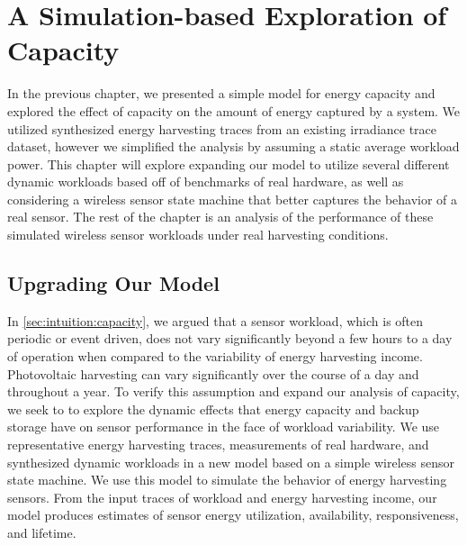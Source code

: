 \chapter{A Simulation-based Exploration of Capacity}
\label{chap:capacity}
In the previous chapter, we presented a simple model for energy capacity and explored the effect of capacity on the amount of energy captured by a system. 
We utilized synthesized energy harvesting traces from an existing irradiance trace dataset, however we simplified the analysis by assuming a static average workload power.
This chapter will explore expanding our model to utilize several different dynamic workloads based off of benchmarks of real hardware, as well as considering a wireless sensor state machine that better captures the behavior of a real sensor.
The rest of the chapter is an analysis of the performance of these simulated wireless sensor workloads under real harvesting conditions.

\section{Upgrading Our Model}
\label{sec:capacity:modelling}
In \cref{sec:intuition:capacity}, we argued that a sensor workload, which is often periodic or event driven, does not vary significantly beyond a few hours to a day of operation when compared to the variability of energy harvesting income. Photovoltaic harvesting can vary significantly over the course of a day and throughout a year. 
To verify this assumption and expand our analysis of capacity, we seek to to explore the dynamic effects that energy
capacity and backup storage have on sensor performance in the face of workload variability.
We use representative energy harvesting traces, measurements of real hardware,
and synthesized dynamic workloads in a new model based on a simple wireless sensor state machine.
We use this model to simulate
the behavior of energy harvesting sensors. 
From the input traces of workload and energy harvesting income, our model produces estimates of sensor energy utilization, availability, responsiveness, and lifetime.


